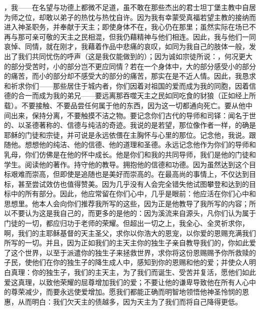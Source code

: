 ，我——在名望与功德上都微不足道，虽不敢在那些杰出的君士坦丁堡主教中自居为师之位，却敢以弟子的热忱与热忱自许。因为我有幸蒙受真福若望主教的接纳而进入神圣职务，并奉献于天主；即使身体不在，我心仍在那里；虽然实际在场已不再与那可亲可敬的天主之民相混，但我仍藉精神与他们相连。因此，我与他们一同哀悼、同情，就在刚才，我藉着作品中悲痛的哀叹，如同为我自己的肢体一般，发出了我们共同忧伤的呼声（这是我仅能做到的）；因为诚如宗徒所说：，何况更大的部分受苦时，小的部分岂不更应同情？若在一个身体中，大的部分感受小的部分的痛苦，而小的部分却不感受大的部分的痛苦，那实在是不近人情。因此，我恳求和祈求你们——那些居住于城内者，你们因着对祖国的爱而成为我的同胞，因着信德的合一而成为我的弟兄——要远离那吞噬天主之民如同吃食的豺狼（正如经上所载）。不要接触、不要品尝任何属于他的东西，因为这一切都通向死亡。要从他中间出来，保持分离，不要触摸不洁之物。要记念你们古代的导师和司铎：闻名于世的、以圣德著称的、信德与纯洁的奇迹。我说的是若望，那位像作者一样，的确是耶稣的门徒和宗徒，并可说是永远依偎在主胸怀与心里的那位。记念他，我说。跟随他。想想他的纯洁、他的信德、他的道理和圣德。永远记念他作为你们的导师和乳母，你们仿佛是在他的怀中成长。他是你们和我的共同导师，我们是他的门徒和学生。阅读他的著作。持守他的教导。拥抱他的信德和功德。因为虽然达到这个目标艰难而崇高，但即使是追随也是美好而崇高的。在最高尚的事情上，不仅达到目标，甚至尝试效仿也值得赞美。因为几乎没有人会完全错失他试图攀登和达到的目标中的所有部分。因此，他应常留在你们心中，几乎是眼前：他应活在你们心中和思想里。他本人会向你们推荐我所写的这些，因为正是他教导了我所写的内容；所以不要认为这是我自己的，而更多的是他的：因为溪流来自源头，凡你们认为属于门徒的一切，都应归功于老师的荣耀。但超出一切之上，我全心、全灵祈求你，啊，我们的主耶稣基督的天主圣父，求你以你浩大的恩宠，以你爱的恩赐充满我们所写的一切。并且，因为正如我们的主天主你的独生子亲自教导我们的，你如此爱了这个世界，以至于派遣你的独生子来拯救世界，求你将这份恩赐赐予你所救赎的子民，使他们在你的独生子的降生成人中，感知到你的恩赐和他的爱；并使众人明白真理：你的独生子，我们的主天主，为了我们而诞生、受苦并复活，愿他们如此爱这真理，以致他荣耀的屈尊增加我们的爱；不要让他的谦卑导致他在所有人心中的尊荣减少，而要永远使爱增加。愿我们都能正确而明智地领悟他神圣怜悯的恩惠，从而明白：我们欠天主的债越多，因为天主为了我们而将自己降得更低。\par


